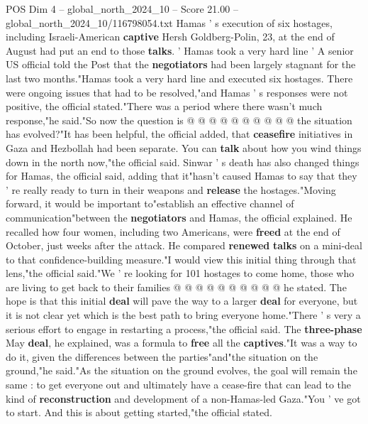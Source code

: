 \begin{textsample}{POS Dim 4 – global\_north\_2024\_10 – Score 21.00 – global\_north\_2024\_10/116798054.txt}
Hamas ' s execution of six hostages, including Israeli-American \textbf{captive} Hersh Goldberg-Polin, 23, at the end of August had put an end to those \textbf{talks}. ' Hamas took a very hard line ' A senior US official told the Post that the \textbf{negotiators} had been largely stagnant for the last two months."Hamas took a very hard line and executed six hostages.
There were ongoing issues that had to be resolved,"and Hamas ' s responses were not positive, the official stated."There was a period where there wasn't much response,"he said."So now the question is @ @ @ @ @ @ @ @ @ @ the situation has evolved?"It has been helpful, the official added, that \textbf{ceasefire} initiatives in Gaza and Hezbollah had been separate.
You can \textbf{talk} about how you wind things down in the north now,"the official said.
Sinwar ' s death has also changed things for Hamas, the official said, adding that it"hasn't caused Hamas to say that they ' re really ready to turn in their weapons and \textbf{release} the hostages."Moving forward, it would be important to"establish an effective channel of communication"between the \textbf{negotiators} and Hamas, the official explained.
He recalled how four women, including two Americans, were \textbf{freed} at the end of October, just weeks after the attack.
He compared \textbf{renewed} \textbf{talks} on a mini-deal to that confidence-building measure."I would view this initial thing through that lens,"the official said."We ' re looking for 101 hostages to come home, those who are living to get back to their families @ @ @ @ @ @ @ @ @ @ he stated.
The hope is that this initial \textbf{deal} will pave the way to a larger \textbf{deal} for everyone, but it is not clear yet which is the best path to bring everyone home."There ' s very a serious effort to engage in restarting a process,"the official said.
The \textbf{three-phase} May \textbf{deal}, he explained, was a formula to \textbf{free} all the \textbf{captives}."It was a way to do it, given the differences between the parties"and"the situation on the ground,"he said."As the situation on the ground evolves, the goal will remain the same : to get everyone out and ultimately have a cease-fire that can lead to the kind of \textbf{reconstruction} and development of a non-Hamas-led Gaza."You ' ve got to start.
And this is about getting started,"the official stated.

\end{textsample}
